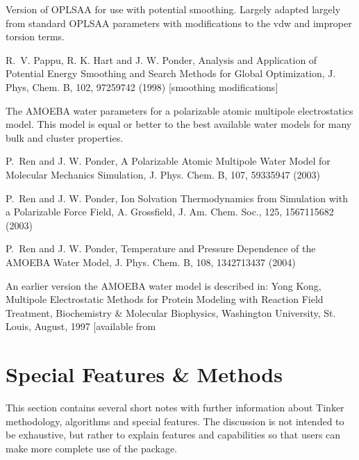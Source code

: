 \documentclass[letterpaper,11pt,english]{sphinxmanual}
\begin{document}
Version of OPLS\sphinxhyphen{}AA for use with potential smoothing. Largely adapted largely from standard OPLS\sphinxhyphen{}AA parameters with modifications to the vdw and improper torsion terms.

R. V. Pappu, R. K. Hart and J. W. Ponder, Analysis and Application of Potential Energy Smoothing and Search Methods for Global Optimization, J. Phys, Chem. B, 102, 9725\sphinxhyphen{}9742 (1998)  {[}smoothing modifications{]}


The AMOEBA water parameters for a polarizable atomic multipole electrostatics model. This model is equal or better to the best available water models for many bulk and cluster properties.

P. Ren and J. W. Ponder, A Polarizable Atomic Multipole Water Model for Molecular Mechanics Simulation, J. Phys. Chem. B, 107, 5933\sphinxhyphen{}5947 (2003)

P. Ren and J. W. Ponder, Ion Solvation Thermodynamics from Simulation with a Polarizable Force Field, A. Grossfield, J. Am. Chem. Soc., 125, 15671\sphinxhyphen{}15682 (2003)

P. Ren and J. W. Ponder, Temperature and Pressure Dependence of the AMOEBA Water Model, J. Phys. Chem. B, 108, 13427\sphinxhyphen{}13437 (2004)

An earlier version the AMOEBA water model is described in: Yong Kong, Multipole Electrostatic Methods for Protein Modeling with Reaction Field Treatment, Biochemistry \& Molecular Biophysics, Washington University, St. Louis, August, 1997 {[}available from \sphinxurl{http://dasher.wustl.edu/ponder/}{]}


\chapter{Special Features \& Methods}
\label{\detokenize{text/special-features:special-features-methods}}\label{\detokenize{text/special-features::doc}}
This section contains several short notes with further information about Tinker methodology, algorithms and special features. The discussion is not intended to be exhaustive, but rather to explain features and capabilities so that users can make more complete use of the package.
\end{document}
